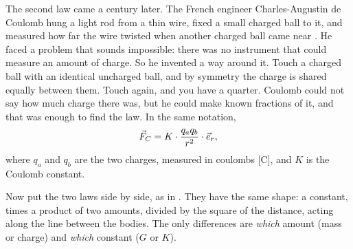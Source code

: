 
The second law came a century later. The French engineer Charles-Augustin de Coulomb hung a light rod from a thin wire, fixed a small charged ball to it, and measured how far the wire twisted when another charged ball came near \citep{Coulomb1785}. He faced a problem that sounds impossible: there was no instrument that could measure an amount of charge. So he invented a way around it. Touch a charged ball with an identical uncharged ball, and by symmetry the charge is shared equally between them. Touch again, and you have a quarter. Coulomb could not say how much charge there was, but he could make known fractions of it, and that was enough to find the law. In the same notation,
\[
\vec{F}_C = K \cdot \frac{q_a q_b}{r^2} \cdot \vec{e}_r ,
\]
where $q_a$ and $q_b$ are the two charges, measured in coulombs [C], and $K$ is the Coulomb constant.

Now put the two laws side by side, as in . They have the same shape: a constant, times a product of two amounts, divided by the square of the distance, acting along the line between the bodies. The only differences are \emph{which} amount (mass or charge) and \emph{which} constant ($G$ or $K$).

